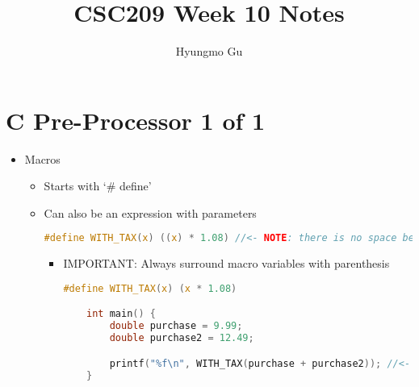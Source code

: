 \documentclass[12pt]{article}
\begin{document}
\title{CSC209 Week 10 Notes}
\author{Hyungmo Gu}
\maketitle

\section*{C Pre-Processor 1 of 1}

\bigskip

\begin{itemize}
    \item Macros
    \begin{itemize}
        \item Starts with `\# define'
        \item Can also be an expression with parameters

    \begin{lstlisting}[language=c]
    #define WITH_TAX(x) ((x) * 1.08) //<- NOTE: there is no space between WITH_TAX and (x)
    \end{lstlisting}

        \begin{itemize}
            \item IMPORTANT: Always surround macro variables with parenthesis
    \begin{lstlisting}[language=c, caption={macros\_example\_1.c}]
    #define WITH_TAX(x) (x * 1.08)

    int main() {
        double purchase = 9.99;
        double purchase2 = 12.49;

        printf("%f\n", WITH_TAX(purchase + purchase2)); //<- will result in purchase + purchase2 * 1.08.
    }
    \end{lstlisting}
        \end{itemize}


    \end{itemize}
\end{itemize}
\end{document}
